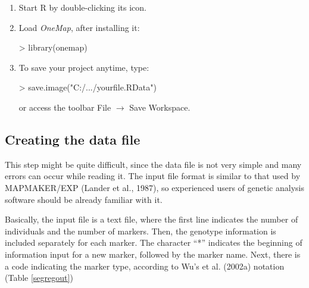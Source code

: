 \documentclass[letterpaper,12pt,oneside]{article}
\begin{document}
\begin{enumerate}
\item Start R by double-clicking its icon.

\item Load {\sl OneMap}, after installing it:
\begin{Schunk}
\begin{Sinput}
> library(onemap)
\end{Sinput}
\end{Schunk}

\item To save your project anytime, type:
\begin{Schunk}
\begin{Sinput}
> save.image("C:/.../yourfile.RData")
\end{Sinput}
\end{Schunk}
or access the toolbar File $\to$ Save Workspace.
\end{enumerate}


\subsection{Creating the data file}
This step might be quite difficult, since the data file is not very simple and many errors can occur while reading it. The input file format is similar to that used by MAPMAKER/EXP (Lander et al., 1987), so experienced users of genetic analysis software should be already familiar with it.

Basically, the input file is a text file, where the first line indicates the number of individuals and the number of markers. Then, the genotype information is included separately for each marker. The character ``*'' indicates the beginning of information input for a new marker, followed by the marker name. Next, there is a code indicating the marker type, according to Wu's et al. (2002a) notation (Table \ref{segregout})

\vspace{.5cm}
\end{document}
